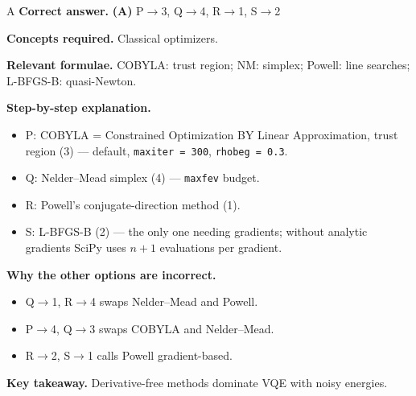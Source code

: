 \documentclass[11pt,a4paper]{article}
\newcommand{\qsep}{\par\vspace{2pt}{\color{black!15}\hrule}\vspace{4pt}}
\begin{document}
\begin{solbox}{A}
\textbf{\color{brand}Correct answer.} \textcolor{okgreen}{\textbf{(A)}} P$\to$3, Q$\to$4, R$\to$1, S$\to$2

\textbf{\color{brand}Concepts required.} Classical optimizers.

\textbf{\color{brand}Relevant formulae.} COBYLA: trust region; NM: simplex; Powell: line searches; L-BFGS-B: quasi-Newton.

\textbf{\color{brand}Step-by-step explanation.} \begin{itemize}\itemsep0pt
\item P: COBYLA = Constrained Optimization BY Linear Approximation, trust region (3) --- default, \texttt{maxiter = 300}, \texttt{rhobeg = 0.3}.
\item Q: Nelder--Mead simplex (4) --- \texttt{maxfev} budget.
\item R: Powell's conjugate-direction method (1).
\item S: L-BFGS-B (2) --- the only one needing gradients; without analytic gradients SciPy uses $n + 1$ evaluations per gradient.
\end{itemize}

\textbf{\color{brand}Why the other options are incorrect.}
\begin{itemize}[leftmargin=2.4em, itemsep=1pt, topsep=2pt]
\item[\textbf{(B)}] Q$\to$1, R$\to$4 swaps Nelder--Mead and Powell.
\item[\textbf{(C)}] P$\to$4, Q$\to$3 swaps COBYLA and Nelder--Mead.
\item[\textbf{(D)}] R$\to$2, S$\to$1 calls Powell gradient-based.
\end{itemize}
\textbf{\color{brand}Key takeaway.} Derivative-free methods dominate VQE with noisy energies.
\end{solbox}
\qsep
\end{document}
